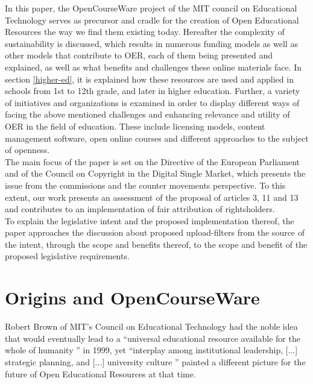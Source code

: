 \documentclass[a4paper]{article}
\begin{document}
\noindent
In this paper, the OpenCourseWare project of the MIT council on Educational Technology serves as precursor and cradle for the creation of Open Educational Resources the way we find them existing today. Hereafter the complexity of sustainability is discussed, which results in numerous funding models as well as other models that contribute to OER, each of them being presented and explained, as well as what benefits and challenges these online materials face. In section \ref{higher-ed}, it is explained how these resources are used and applied in schools from 1st to 12th grade, and later in higher education. Further, a variety of initiatives and organizations is examined in order to display different ways of facing the above mentioned challenges and enhancing relevance and utility of OER in the field of education. These include licensing models, content management software, open online courses and different approaches to the subject of openness. \\ 

\noindent
The main focus of the paper is set on the Directive of the European Parliament and of the Council on Copyright in the Digital Single Market, which presents the issue from the commissions and the counter movements perspective. To this extent, our work presents an assessment of the proposal of articles 3, 11 and 13 and contributes to an implementation of fair attribution of rightsholders. \\

\noindent
To explain the legislative intent and the proposed implementation thereof, the paper approaches the discussion about proposed upload-filters from the source of the intent, through the scope and benefits thereof, to the scope and benefit of the proposed legislative requirements. 

\section{Origins and OpenCourseWare} \label{mit} 

Robert Brown of MIT's Council on Educational Technology had the noble idea that would eventually lead to a ``universal educational resource available for the whole of humanity \cite{open-courseware}'' in 1999, yet ``interplay among institutional leadership, [...] strategic planning, and [...] university culture \cite{OCW}'' painted a different picture for the future of Open Educational Resources at that time. \\
\end{document}
